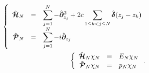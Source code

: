 \begin{eqnarray}
	&& \left \{ \begin{array}{rcl} \hat{\bm{ \mathcal{H}}}_N & = & \displaystyle \sum_{j=1}^N   - \hat{\bm{\partial}}_{z_j}^2 + 2c \sum_{1 \leq k < j \leq N } \hat{\bm{\delta}} ( z_j - z_k) \\ \hat{\bm{\mathcal{P}}}_N & = & \displaystyle \sum_{j=1}^N -i \hat{\bm{\partial}}_{z_j}\end{array} \right .  \label{eq.1.11}\\
	&& \left \{ \begin{array}{rcl}\hat{\bm{ \mathcal{H}}}_N \chi_N &=&	E_N \chi_N \\ \hat{\bm{ \mathcal{P}}}_N \chi_N &=&	p_N \chi_N\end{array} \right . .\label{eq.1.12}
\end{eqnarray}